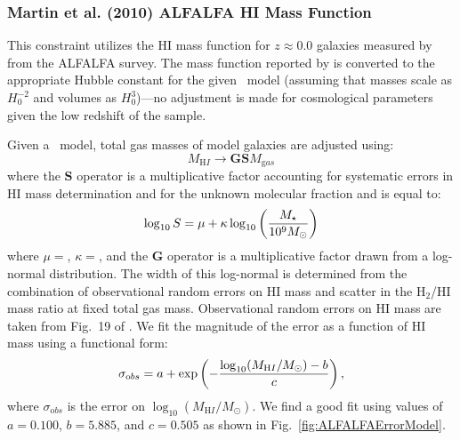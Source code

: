 \subsubsection{Martin et al. (2010) ALFALFA HI Mass Function}\label{sec:AnalysisALFALFAHIMassFunction}

This constraint utilizes the HI mass function for $z\approx 0.0$ galaxies measured by \cite{martin_arecibo_2010} from the ALFALFA survey. The mass function reported by \cite{martin_arecibo_2010} is converted to the appropriate Hubble constant for the given \glc\ model (assuming that masses scale as $H_0^{-2}$ and volumes as $H_0^3$)---no adjustment is made for cosmological parameters given the low redshift of the sample.

Given a \glc\ model, total gas masses of model galaxies are adjusted using:
\begin{equation}
 M_{\mathrm HI} \rightarrow {\mathbf G} {\mathbf S} M_{\mathrm gas}
\end{equation}
where the ${\mathbf S}$ operator is a multiplicative factor accounting for systematic errors in HI mass determination and for the unknown molecular fraction and is equal to:
\begin{equation}
 \log_{\mathrm 10} S = \mu + \kappa \log_{\mathrm 10} \left({M_\star \over 10^9M_\odot}\right)
\end{equation}
where $\mu=${\normalfont {}}, $\kappa=${\normalfont {}}, and the {\normalfont \bfseries G} operator is a multiplicative factor drawn from a log-normal distribution. The width of this log-normal is determined from the combination of observational random errors on HI mass and scatter in the H$_2$/HI mass ratio at fixed total gas mass. Observational random errors on HI mass are taken from Fig.~19 of \cite{haynes_arecibo_2011}. We fit the magnitude of the error as a function of HI mass using a functional form:
\begin{equation}
 \sigma_{\mathrm obs} = a + \exp\left(-{\log_{10}(M_{\mathrm HI}/M_\odot)-b\over c}\right),
\end{equation}
where $\sigma_{\mathrm obs}$ is the error on $\log_{10}(M_{\mathrm HI}/M_\odot)$. We find a good fit using values of $a=0.100$, $b=5.885$, and $c=0.505$ as shown in Fig.~\ref{fig:ALFALFAErrorModel}. 


